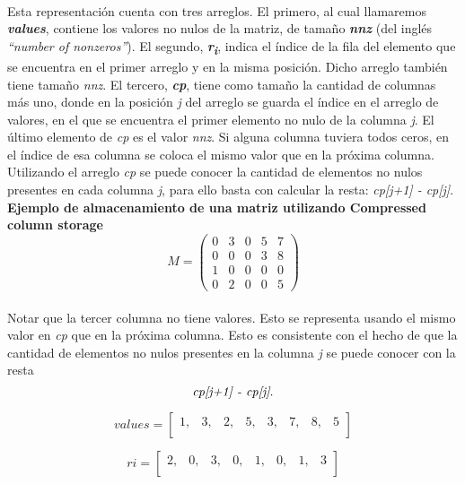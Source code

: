\documentclass[a4paper,11pt]{article}
\begin{document}
\paragraph{}
Esta representaci\'on cuenta con tres arreglos. El primero, al cual llamaremos \textbf{\emph{values}}, contiene los valores no nulos de la matriz, de tamaño \textbf{\emph{nnz}} (del ingl\'es \emph{``number of nonzeros''}). El segundo, \textbf{\emph{r\textsubscript{i}}}, indica el \'indice de la fila del elemento que se encuentra en el primer arreglo y en la misma posici\'on. Dicho arreglo tambi\'en tiene tamaño \emph{nnz}. El tercero, \textbf{\emph{cp}}, tiene como tamaño la cantidad de columnas m\'as uno, donde en la posici\'on \emph{j} del arreglo se guarda el \'indice en el arreglo de valores, en el que se encuentra el primer elemento no nulo de la columna \emph{j}. El \'ultimo elemento de \emph{cp} es el valor \emph{nnz}. Si alguna columna tuviera todos ceros, en el \'indice de esa columna se coloca el mismo valor que en la pr\'oxima columna. Utilizando el arreglo \emph{cp} se puede conocer la cantidad de elementos no nulos presentes en cada columna \emph{j}, para ello basta con calcular la resta: \emph{cp[j+1] - cp[j]}.\\

\textbf{Ejemplo de almacenamiento de una matriz utilizando Compressed column storage}\\
\[ M = \left( \begin{array}{ccccc}
0 & 3 & 0 & 5 & 7 \\
0 & 0 & 0 & 3 & 8 \\
1 & 0 & 0 & 0 & 0 \\
0 & 2 & 0 & 0 & 5\end{array} \right)\]

\paragraph{}
Notar que la tercer columna no tiene valores. Esto se representa usando el mismo valor en \emph{cp} que en la pr\'oxima columna. Esto es consistente con el hecho de que la cantidad de elementos no nulos presentes en la columna \emph{j} se puede conocer con la resta \[\emph{cp[j+1] - cp[j]}.\]

\[ values = \left[ \begin{array}{cccccccc}
1, & 3, & 2, & 5, & 3, & 7, & 8, & 5 \\\end{array} \right]\]

\[ ri = \left[ \begin{array}{cccccccc}
2, & 0, & 3, & 0, & 1, & 0, & 1, & 3 \\\end{array} \right]\]
\end{document}
